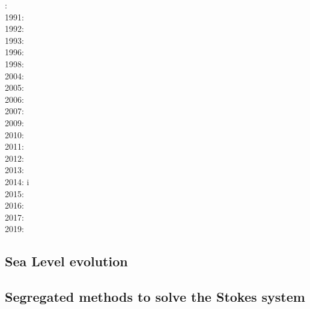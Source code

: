 {\scriptsize
{}: \cite{woid78}\\
1991: \cite{tars91}\\
1992: \cite{zaju92}\\
1993: \cite{nabr93}\cite{vasv93}\cite{wejv93}\cite{wein93}\\
1996: \cite{maar96}\\
1998: \cite{giju98}\\
2004: \cite{istt04}\cite{geim04}\cite{mcmg04}\\
2005: \cite{gebi05}\\
2006: \cite{maqs06}\\
2007: \cite{huja07}\cite{maqs07}\\
2009: \cite{grba09}\\
2010: \cite{albe10}\cite{albi10}\cite{inbe10}\cite{inbe10b}\cite{albs10}\\
2011: \cite{brfo11}\\
2012: \cite{fejr12}\cite{liqi12}\cite{grbe12}\cite{albe12}\cite{grbi12}\cite{goib12}\cite{rukb12}\\
2013: \cite{gobi13}\cite{nipc13}\\
2014: \cite{bakp14}\cite{feka14a}\cite{feka14b}\cite{ghbu14}\cite{nifh14}i\cite{peel14}\\
2015: \cite{feka15}\cite{cofk15}\\
2016: \cite{masg16}\cite{albe16}\\
2017: \cite{grbe17}\cite{henf17}\\
2019: \cite{hadv19}\cite{clcc19}
}

\subsection{Sea Level evolution}

{\scriptsize
\noindent
\cite{pefc78}
\cite{pazw07}
\cite{cohu09}
\cite{conr13}
}

\subsection{Segregated methods to solve the Stokes system}


{\scriptsize
\noindent
\cite{raju91}
\cite{haeh93}
\cite{leru95}
\cite{duto98}
\cite{wade03}
\cite{wade04}
\cite{utne08}
}

